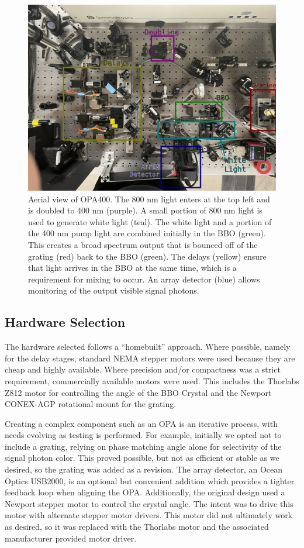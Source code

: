 \begin{figure}
	\includegraphics[width=6in]{opa400/images/opa400}
\caption[OPA 400 Optics]{
	Aerial view of OPA400. The 800 nm light enters at the top left and is doubled to 400 nm (purple). 
	A small portion of 800 nm light is used to generate white light (teal).
	The white light and a portion of the 400 nm pump light are combined initially in the BBO (green).
	This creates a broad spectrum output that is bounced off of the grating (red) back to the BBO (green).
	The delays (yellow) ensure that light arrives in the BBO at the same time, which is a requirement for mixing to occur.
	An array detector (blue) allows monitoring of the output visible signal photons.
}
\label{opa4:fig:opa_photo}
\end{figure}

\subsection{Hardware Selection}

The hardware selected follows a ``homebuilt'' approach.
Where possible, namely for the delay stages, standard NEMA stepper motors were used because they are cheap and highly available.
Where precision and/or compactness was a strict requirement, commercially available motors were used.
This includes the Thorlabs Z812\cite{thorlabs_z812} motor for controlling the angle of the BBO Crystal and the Newport CONEX-AGP\cite{newport_conex_agp} rotational mount for the grating.

Creating a complex component such as an OPA is an iterative process, with needs evolving as testing is performed.
For example, initially we opted not to include a grating, relying on phase matching angle alone for selectivity of the signal photon color.
This proved possible, but not as efficient or stable as we desired, so the grating was added as a revision.
The array detector, an Ocean Optics USB2000, is an optional but convenient addition which provides a tighter feedback loop when aligning the OPA.
Additionally, the original design used a Newport stepper motor to control the crystal angle.
The intent was to drive this motor with alternate stepper motor drivers.
This motor did not ultimately work as desired, so it was replaced with the Thorlabs motor and the associated manufacturer provided motor driver.

